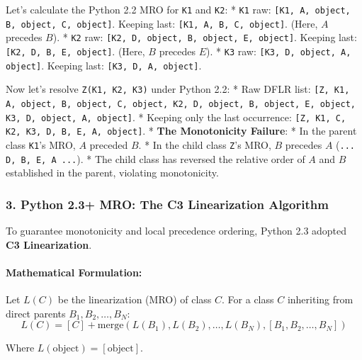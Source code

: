 Let's calculate the Python 2.2 MRO for \passthrough{\lstinline!K1!} and
\passthrough{\lstinline!K2!}: * \passthrough{\lstinline!K1!} raw:
\passthrough{\lstinline![K1, A, object, B, object, C, object]!}. Keeping
last: \passthrough{\lstinline![K1, A, B, C, object]!}. (Here, \(A\)
precedes \(B\)). * \passthrough{\lstinline!K2!} raw:
\passthrough{\lstinline![K2, D, object, B, object, E, object]!}. Keeping
last: \passthrough{\lstinline![K2, D, B, E, object]!}. (Here, \(B\)
precedes \(E\)). * \passthrough{\lstinline!K3!} raw:
\passthrough{\lstinline![K3, D, object, A, object]!}. Keeping last:
\passthrough{\lstinline![K3, D, A, object]!}.

Now let's resolve \passthrough{\lstinline!Z(K1, K2, K3)!} under Python
2.2: * Raw DFLR list:
\passthrough{\lstinline![Z, K1, A, object, B, object, C, object, K2, D, object, B, object, E, object, K3, D, object, A, object]!}.
* Keeping only the last occurrence:
\passthrough{\lstinline![Z, K1, C, K2, K3, D, B, E, A, object]!}. *
\textbf{The Monotonicity Failure}: * In the parent class
\passthrough{\lstinline!K1!}'s MRO, \(A\) preceded \(B\). * In the child
class \passthrough{\lstinline!Z!}'s MRO, \(B\) precedes \(A\)
(\passthrough{\lstinline!... D, B, E, A ...!}). * The child class has
reversed the relative order of \(A\) and \(B\) established in the
parent, violating monotonicity.

\hypertarget{python-2.3-mro-the-c3-linearization-algorithm}{%
\subsubsection{3. Python 2.3+ MRO: The C3 Linearization
Algorithm}\label{python-2.3-mro-the-c3-linearization-algorithm}}

To guarantee monotonicity and local precedence ordering, Python 2.3
adopted \textbf{C3 Linearization}.

\hypertarget{mathematical-formulation}{%
\paragraph{Mathematical Formulation:}\label{mathematical-formulation}}

Let \(L(C)\) be the linearization (MRO) of class \(C\). For a class
\(C\) inheriting from direct parents \(B_1, B_2, \dots, B_N\):
\[L(C) = [C] + \text{merge}\left(L(B_1), L(B_2), \dots, L(B_N), [B_1, B_2, \dots, B_N]\right)\]

Where \(L(\text{object}) = [\text{object}]\).


